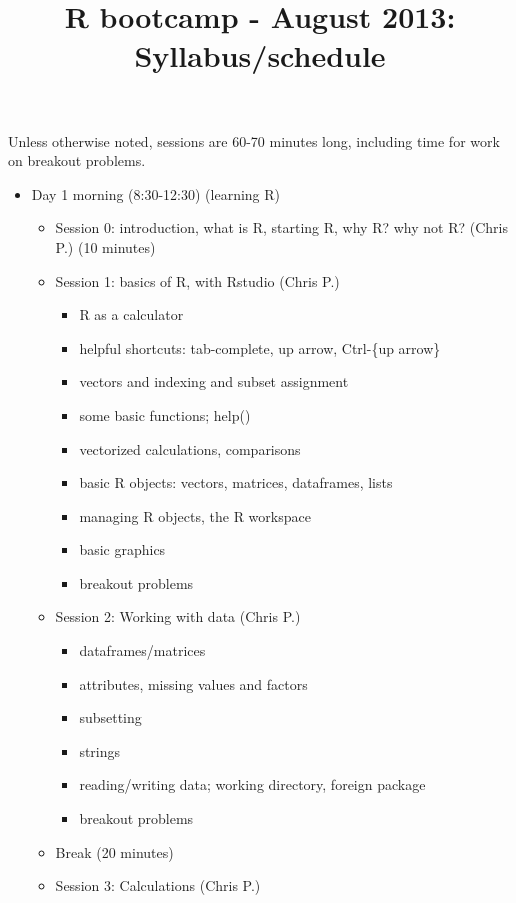 \documentclass[12pt]{article}\usepackage{graphicx, color}
\begin{document}
\title{R bootcamp - August 2013: Syllabus/schedule}

\maketitle

\subsection*{}

Unless otherwise noted, sessions are 60-70 minutes long, including
time for work on breakout problems.
\begin{itemize}
\item Day 1 morning (8:30-12:30) (learning R)

\begin{itemize}
\item Session 0: introduction, what is R, starting R, why R? why not R?
(Chris P.) (10 minutes)
\item Session 1: basics of R, with Rstudio (Chris P.)

\begin{itemize}
\item R as a calculator
\item helpful shortcuts: tab-complete, up arrow, Ctrl-\{up arrow\}
\item vectors and indexing and subset assignment
\item some basic functions; help()
\item vectorized calculations, comparisons
\item basic R objects: vectors, matrices, dataframes, lists
\item managing R objects, the R workspace
\item basic graphics
\item breakout problems  
\end{itemize}
\item Session 2: Working with data (Chris P.)

\begin{itemize}
\item dataframes/matrices
\item attributes, missing values and factors
\item subsetting
\item strings
\item reading/writing data; working directory, foreign package
\item breakout problems 
\end{itemize}
\item Break (20 minutes)
\item Session 3: Calculations (Chris P.)


\end{itemize}
\end{itemize}
\end{document}

